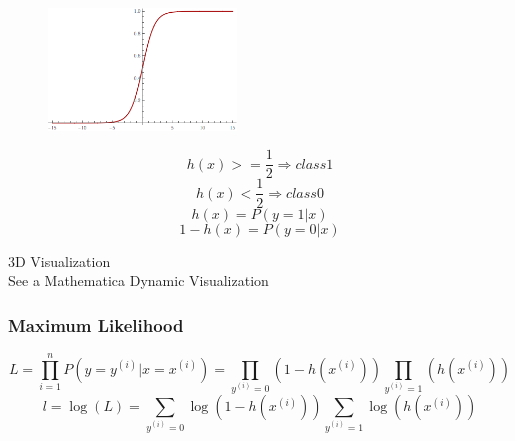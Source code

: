 \documentclass{beamer}
\begin{document}
\begin{frame}
\begin{figure}[t]
\includegraphics[width=5cm]{graphics/1d-sigmoid}
\centering
\end{figure}
\[h(x)>=\frac{1}{2}  \Rightarrow class 1\]
\[h(x)<\frac{1}{2}  \Rightarrow class 0\]
\[h(x)=P(y=1|x)\]
\[1-h(x)=P(y=0|x)\]
\end{frame}
\begin{frame}
3D Visualization \\
See a Mathematica Dynamic Visualization
\end{frame}
\begin{frame}
\frametitle{Maximum Likelihood}
\begin{equation}
L = \prod_{i=1}^n P(y = y^{(i)}  | x = x^{(i)}) 
= \prod_{y^{(i)} = 0 } (1-h(x^{(i)})) \prod_{y^{(i)} = 1 } (h(x^{(i)}))
\end{equation}
\begin{equation}
l =  \log (L) = \sum_{y^{(i)} = 0 } \log (1-h(x^{(i)})) \sum_{y^{(i)} = 1} \log (h(x^{(i)}))
\end{equation}
\end{frame}
\end{document}
